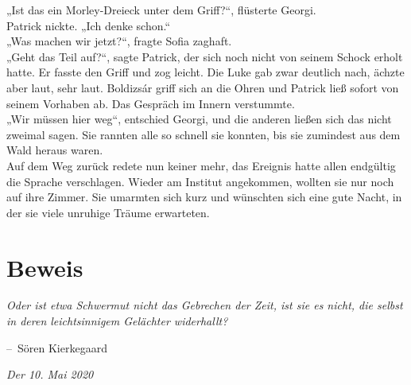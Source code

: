 \documentclass[oneside]{memoir}
\makeatletter
\newenvironment{chapquote}[2][2em]
  {\setlength{\@tempdima}{#1}%
   \def\chapquote@author{#2}%
   \parshape 1 \@tempdima \dimexpr\textwidth-2\@tempdima\relax%
   \itshape}
  {\par\normalfont\hfill--\ \chapquote@author\hspace*{\@tempdima}\par\bigskip}
\makeatother
\begin{document}
\noindent „Ist das ein Morley-Dreieck unter dem Griff?“, flüsterte Georgi. \\
Patrick nickte. „Ich denke schon.“ \\
„Was machen wir jetzt?“, fragte Sofia zaghaft. \\
„Geht das Teil auf?“, sagte Patrick, der sich noch nicht von seinem Schock erholt hatte. Er fasste den Griff und zog leicht. Die Luke gab zwar deutlich nach, ächzte aber laut, sehr laut. Boldizsár griff sich an die Ohren und Patrick ließ sofort von seinem Vorhaben ab. Das Gespräch im Innern verstummte. \\
„Wir müssen hier weg“, entschied Georgi, und die anderen ließen sich das nicht zweimal sagen. Sie rannten alle so schnell sie konnten, bis sie zumindest aus dem Wald heraus waren. \\
Auf dem Weg zurück redete nun keiner mehr, das Ereignis hatte allen endgültig die Sprache verschlagen. Wieder am Institut angekommen, wollten sie nur noch auf ihre Zimmer. Sie umarmten sich kurz und wünschten sich eine gute Nacht, in der sie viele unruhige Träume erwarteten.



\chapter{Beweis} %
\begin{chapquote}{Sören Kierkegaard}
\glqq Oder ist etwa Schwermut nicht das Gebrechen der Zeit, ist sie es nicht, die selbst in deren leichtsinnigem Gelächter widerhallt?\grqq
\end{chapquote}

\textit{Der 10. Mai 2020}
\end{document}
